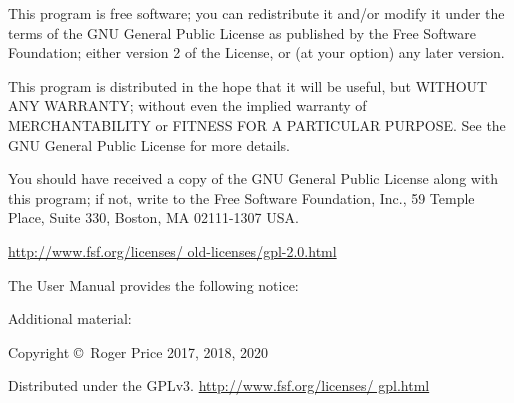 \documentclass[12pt]{article}
\begin{document}
\textsf{This program is free software; you can redistribute it and/or modify
  it under the terms of the GNU General Public License as published by the
  Free Software Foundation; either version 2 of the License, or (at your
  option) any later version.}

\textsf{This program is distributed in the hope that it will be useful, but
  WITHOUT ANY WARRANTY; without even the implied warranty of MERCHANTABILITY
  or FITNESS FOR A PARTICULAR PURPOSE.  See the GNU General Public License for
  more details.}

\textsf{You should have received a copy of the GNU General Public License
  along with this program; if not, write to the Free Software Foundation,
  Inc., 59 Temple Place, Suite 330, Boston, MA 02111-1307 USA.}
  
\href{http://www.fsf.org/licenses/old-licenses/gpl-2.0.html}
     {http://{\allowbreak}www.fsf.org/{\allowbreak}licenses/%
       {\allowbreak}old-licenses/{\allowbreak}gpl-2.0.html}

\vspace*{\fill}

The User Manual provides the following notice: 


\vspace*{\fill}

Additional material:

\textsf{Copyright \copyright\ Roger Price 2017, 2018, 2020}

\textsf{Distributed under the GPLv3.}
\href{http://www.fsf.org/licenses/gpl.html}
     {http://{\allowbreak}www.fsf.org/{\allowbreak}licenses/%
       {\allowbreak}gpl.html}

\vspace*{\fill}
\noindent\hrulefill
\vspace*{\fill}
\end{document}
